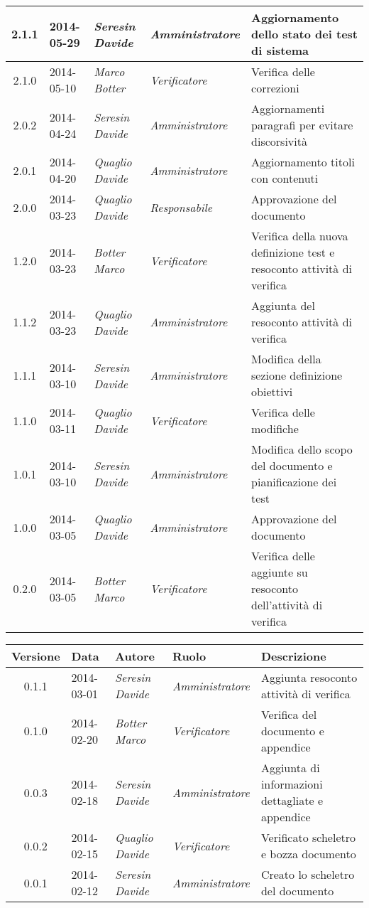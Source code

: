 \begin{small}
\begin{tabular}{|c|p{1.8cm}|p{2.8cm}|p{2.8cm}|p{3.5cm}|}
\hline
2.1.1 & 2014-05-29 & 
\textit{Seresin Davide} &
\textit{Amministratore} &  Aggiornamento dello stato dei test di sistema\\
\hline
2.1.0 & 2014-05-10 & 
\textit{Marco Botter} &
\textit{Verificatore} &  Verifica delle correzioni\\
\hline
2.0.2 & 2014-04-24 & 
\textit{Seresin Davide} &
\textit{Amministratore} &  Aggiornamenti paragrafi per evitare discorsività\\
\hline
2.0.1 & 2014-04-20 & 
\textit{Quaglio Davide} &
\textit{Amministratore} &  Aggiornamento titoli con contenuti\\
\hline
2.0.0 & 2014-03-23 & 
\textit{Quaglio Davide} &
\textit{Responsabile} &  Approvazione del documento\\
\hline
1.2.0 & 2014-03-23 & 
\textit{Botter Marco} &
\textit{Verificatore} &  Verifica della nuova definizione test e resoconto attività di verifica\\
\hline
1.1.2 & 2014-03-23 & 
\textit{Quaglio Davide} &
\textit{Amministratore} &  Aggiunta del resoconto attività di verifica\\
\hline
1.1.1 & 2014-03-10 & 
\textit{Seresin Davide} &
\textit{Amministratore} &  Modifica della sezione definizione obiettivi\\
\hline
1.1.0 & 2014-03-11 & 
\textit{Quaglio Davide} &
\textit{Verificatore} &  Verifica delle modifiche\\
\hline
1.0.1 & 2014-03-10 & 
\textit{Seresin Davide} &
\textit{Amministratore} &  Modifica dello scopo del documento e pianificazione dei test\\
\hline
1.0.0 & 2014-03-05 & 
\textit{Quaglio Davide} &
\textit{Amministratore} &  Approvazione del documento\\
\hline
0.2.0 & 2014-03-05 & 
\textit{Botter Marco} &
\textit{Verificatore} &  Verifica delle aggiunte su resoconto dell'attività di verifica\\
\hline
\end{tabular}


\begin{tabular}{|c|p{1.8cm}|p{2.8cm}|p{2.8cm}|p{3.5cm}|}
\hline
Versione & Data & Autore & Ruolo & Descrizione \\
\hline
\hline
0.1.1 & 2014-03-01 & 
\textit{Seresin Davide} &
\textit{Amministratore} &  Aggiunta resoconto attività di verifica\\
\hline
0.1.0 & 2014-02-20 & 
\textit{Botter Marco} &
\textit{Verificatore} &  Verifica del documento e appendice\\
\hline
0.0.3 & 2014-02-18 & 
\textit{Seresin Davide} &
\textit{Amministratore} &  Aggiunta di informazioni dettagliate e appendice\\
\hline
0.0.2 & 2014-02-15 & 
\textit{Quaglio Davide} &
\textit{Verificatore} &  Verificato scheletro e bozza documento\\
\hline
0.0.1 & 2014-02-12 & 
\textit{Seresin Davide} &
\textit{Amministratore} &  Creato lo scheletro del documento\\
\hline
\end{tabular}\\
\end{small}